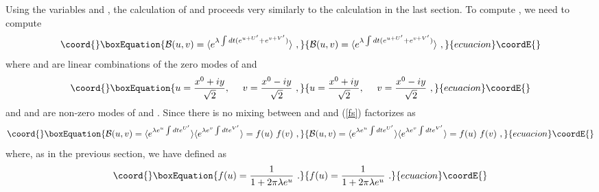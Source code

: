 \documentclass[a4paper,12pt]{article}
\begin{document}
Using the variables \coordHE{} and \coordHE{}, 
the calculation of \coordHE{} and \coordHE{} proceeds very similarly to the calculation in the last section. 
To compute \coordHE{}, we need to compute 
\begin{equation}\coord{}\boxEquation{
{\cal B}(u,v)= \langle e^{\lambda \int dt (e^{u+U'}+e^{v+V'})}\rangle~, 
\label{fs}
}{
{\cal B}(u,v)= \langle e^{\lambda \int dt (e^{u+U'}+e^{v+V'})}\rangle~, 
}{ecuacion}\coordE{}\end{equation}
where \coordHE{} and \coordHE{} are linear combinations of the zero modes of \coordHE{} and \coordHE{}
\begin{equation}\coord{}\boxEquation{
u={x^0+iy \over \sqrt{2}}, ~~~~v={x^0 -iy \over \sqrt{2}}~,
}{
u={x^0+iy \over \sqrt{2}}, ~~~~v={x^0 -iy \over \sqrt{2}}~,
}{ecuacion}\coordE{}\end{equation}
and \coordHE{} and \coordHE{} are non-zero modes of \coordHE{} and \coordHE{}. Since there is no mixing between 
\coordHE{} and \coordHE{} and  (\ref{fs})  factorizes  as
\begin{equation}\coord{}\boxEquation{
{\cal B}(u,v)= \langle e^{\lambda e^{u} \int dt e^{U'}}\rangle  \langle e^{\lambda e^{v} \int dt e^{V'}}\rangle =f(u)~f(v)~,
}{
{\cal B}(u,v)= \langle e^{\lambda e^{u} \int dt e^{U'}}\rangle  \langle e^{\lambda e^{v} \int dt e^{V'}}\rangle =f(u)~f(v)~,
}{ecuacion}\coordE{}\end{equation}
where, as in the previous section, we have  defined \coordHE{} as
\begin{equation}\coord{}\boxEquation{
f(u)={1 \over {1+2 \pi \lambda e^{u}}}~.
}{
f(u)={1 \over {1+2 \pi \lambda e^{u}}}~.
}{ecuacion}\coordE{}\end{equation}
\end{document}
